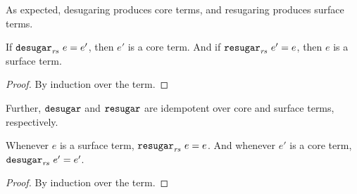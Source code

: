 As expected, desugaring produces core terms, and resugaring produces
surface terms.
\begin{lemma}
If $\texttt{desugar}_{\mathit{rs}}\ {e} = e'$, then $e'$ is a core term. And
if $\texttt{resugar}_{\mathit{rs}}\ {e'} = e$, then $e$ is a surface term.
\end{lemma}
\begin{proof}
By induction over the term.
\end{proof}
Further, $\texttt{desugar}$ and $\texttt{resugar}$ are idempotent over core and surface
terms, respectively.
\begin{lemma}
Whenever $e$ is a surface term, $\texttt{resugar}_{\mathit{rs}}\ {e} = e$.
And whenever $e'$ is a core term, $\texttt{desugar}_{\mathit{rs}}\ {e'} = e'$.
\end{lemma}
\begin{proof}
By induction over the term.
\end{proof}

